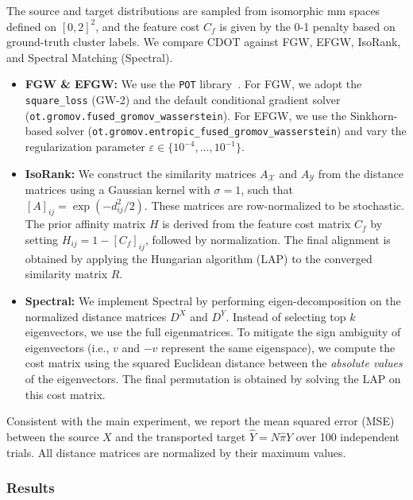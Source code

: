 \documentclass{article}
\theoremstyle{plain}
\theoremstyle{definition}
\theoremstyle{remark}
\begin{document}
The source and target distributions are sampled from isomorphic mm spaces defined on $[0,2]^2$, and the feature cost $C_f$ is given by the 0-1 penalty based on ground-truth cluster labels. We compare CDOT against FGW, EFGW, IsoRank, and Spectral Matching (Spectral).
\begin{itemize}
	\item \textbf{FGW \& EFGW:} We use the \texttt{POT} library~\citep{flamary2021pot}. For FGW, we adopt the \texttt{square\_loss} (GW-2) and the default conditional gradient solver (\texttt{ot.gromov.fused\_gromov\_wasserstein}). For EFGW, we use the Sinkhorn-based solver (\texttt{ot.gromov.entropic\_fused\_gromov\_wasserstein}) and vary the regularization parameter $\varepsilon \in \{10^{-4}, ... , 10^{-1}\}$.
	
	\item \textbf{IsoRank:} We construct the similarity matrices $A_{\mathcal{X}}$ and $A_{\mathcal{Y}}$ from the distance matrices using a Gaussian kernel with $\sigma=1$, such that $[A]_{ij} = \exp(-d_{ij}^2/2)$. These matrices are row-normalized to be stochastic. The prior affinity matrix $H$ is derived from the feature cost matrix $C_f$ by setting $H_{ij} = 1 - [C_f]_{ij}$, followed by normalization. The final alignment is obtained by applying the Hungarian algorithm (LAP) to the converged similarity matrix $R$.
	
	\item \textbf{Spectral:} We implement Spectral by performing eigen-decomposition on the normalized distance matrices $D^X$ and $D^Y$. Instead of selecting top $k$ eigenvectors, we use the full eigenmatrices. To mitigate the sign ambiguity of eigenvectors (i.e., $v$ and $-v$ represent the same eigenspace), we compute the cost matrix using the squared Euclidean distance between the \textit{absolute values} of the eigenvectors. The final permutation is obtained by solving the LAP on this cost matrix.
\end{itemize}
Consistent with the main experiment, we report the mean squared error (MSE) between the source $X$ and the transported target $\hat{Y} = N \hat{\pi} Y$ over 100 independent trials. All distance matrices are normalized by their maximum values.

\subsubsection{Results}
\end{document}
